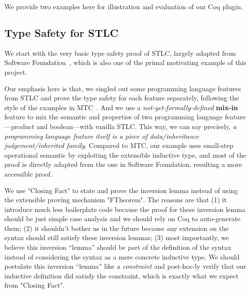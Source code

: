 We provide two examples here for illustration and evaluation of our Coq plugin. 

\subsection{Type Safety for STLC}
We start with the very basic type safety proof of STLC, largely adapted from Software Foundation~\cite{pierce2014software}, which is also one of the primal motivating example of this project. 

Our emphasis here is that, we singled out some programming language features from STLC and prove the type safety for each feature separately, following the style of the examples in MTC~\cite{delaware2013,forsta2020}. And we use a \textit{not-yet-formally-defined} \textbf{mix-in} feature to mix the semantic and properties of two programming language feature---product and boolean---with vanilla STLC. This way, we can say precisely, \textit{a programming language feature itself is a piece of data/inheritance judgement/inherited family}. Compared to MTC, our example uses small-step operational semantic by exploiting the extensible inductive type, and most of the proof is directly adapted from the one in Software Foundation, resulting a more accessible proof. 

We use "Closing Fact" to state and prove the inversion lemma instead of using the extensible proving mechanism "FTheorem". The reasons are that (1) it introduce much less boilerplate code because the proof for these inversion lemma should be just simple case analysis and we should rely on Coq to auto-generate them; (2) it shouldn't bother us in the future because any extension on the syntax should still satisfy these inversion lemmas; (3) most importantly, we believe this inversion ``lemma'' should be part of the definition of the syntax instead of considering the syntax as a mere concrete inductive type. We should postulate this inversion ``lemma'' like \textit{a constraint} and post-hoc-ly verify that our inductive definition did satisfy the constraint, which is exactly what we expect from "Closing Fact".

